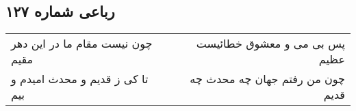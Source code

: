 \begin{center}
\section*{رباعی شماره ۱۲۷}
\label{sec:sh127}
\begin{longtable}{l p{0.5cm} r}
چون نیست مقام ما در این دهر مقیم
&&
پس بی می و معشوق خطائیست عظیم
\\
تا کی ز قدیم و محدث امیدم و بیم
&&
چون من رفتم جهان چه محدث چه قدیم
\\
\end{longtable}
\end{center}
